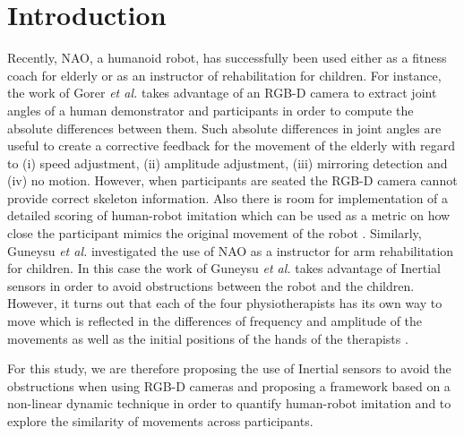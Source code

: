 \documentclass{sig-alternate-05-2015}
\begin{document}


\section{Introduction}
Recently, NAO, a humanoid robot, has successfully been used either as a fitness coach for elderly 
or as an instructor of rehabilitation for children.
For instance, the work of Gorer \textit{et al.} takes advantage of an RGB-D camera to 
extract joint angles of a human demonstrator and participants in order to
compute the absolute differences between them. Such absolute differences
in joint angles are useful to create a corrective feedback for the movement of the elderly 
with regard to (i) speed adjustment, (ii) amplitude adjustment, (iii) mirroring detection
and (iv) no motion.
However, when participants are seated the RGB-D camera cannot provide correct skeleton information.
Also there is room for implementation of a detailed scoring 
of human-robot imitation which can be used as a metric on how close the participant mimics the original movement 
of the robot \cite{Gorer2013, Gorer2016}.
Similarly, Guneysu \textit{et al.} investigated the use of NAO
as a instructor for arm rehabilitation for children. 
In this case the work of Guneysu \textit{et al.} takes advantage of 
Inertial sensors in order to avoid obstructions between the robot and the children.
However,  it turns out that
each of the four physiotherapists has its own way to move
which is reflected in the differences of frequency and amplitude of the movements
as well as the initial positions of the hands of the therapists \cite{Guneysu2015}.

For this study, we are therefore proposing the use 
of Inertial sensors to avoid the obstructions when using RGB-D cameras 
\cite{Gorer2013, Gorer2016} and proposing a framework based on a non-linear dynamic technique 
in order to quantify human-robot imitation 
and to explore the similarity of movements across participants.



\end{document}

